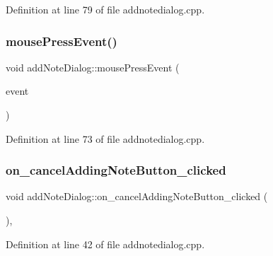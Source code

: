 Definition at line 79 of file addnotedialog.\+cpp.

\hypertarget{classaddNoteDialog_a5479e71fa86229b5d3a2e03ffd3ddbeb}{}\label{classaddNoteDialog_a5479e71fa86229b5d3a2e03ffd3ddbeb} 
\subsubsection{\texorpdfstring{mouse\+Press\+Event()}{mousePressEvent()}}
{\footnotesize\ttfamily void add\+Note\+Dialog\+::mouse\+Press\+Event (\begin{DoxyParamCaption}\item[{Q\+Mouse\+Event $\ast$}]{event }\end{DoxyParamCaption})\hspace{0.3cm}{\ttfamily [private]}}



Definition at line 73 of file addnotedialog.\+cpp.

\hypertarget{classaddNoteDialog_af0e53e8f605b12087a3982e53409ca2f}{}\label{classaddNoteDialog_af0e53e8f605b12087a3982e53409ca2f} 
\subsubsection{\texorpdfstring{on\+\_\+cancel\+Adding\+Note\+Button\+\_\+clicked}{on\_cancelAddingNoteButton\_clicked}}
{\footnotesize\ttfamily void add\+Note\+Dialog\+::on\+\_\+cancel\+Adding\+Note\+Button\+\_\+clicked (\begin{DoxyParamCaption}{ }\end{DoxyParamCaption})\hspace{0.3cm}{\ttfamily [private]}, {\ttfamily [slot]}}



Definition at line 42 of file addnotedialog.\+cpp.

